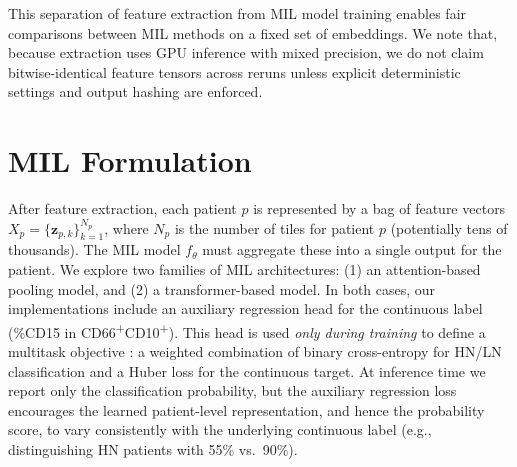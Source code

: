 This separation of feature extraction from MIL model training enables fair comparisons between MIL methods on a fixed set of embeddings. We note that, because extraction uses GPU inference with mixed precision, we do not claim bitwise-identical feature tensors across reruns unless explicit deterministic settings and output hashing are enforced.

\section{MIL Formulation}
\label{sec:mil-heads}
After feature extraction, each patient $p$ is represented by a bag of feature vectors $X_p = \{\mathbf{z}_{p,k}\}_{k=1}^{N_p}$, where $N_p$ is the number of tiles for patient $p$ (potentially tens of thousands). The MIL model $f_\theta$ must aggregate these into a single output for the patient. We explore two families of MIL architectures: (1) an attention-based pooling model, and (2) a transformer-based model. In both cases, our implementations include an auxiliary regression head for the continuous label (\%CD15 in CD66\textsuperscript{+}CD10\textsuperscript{+}). This head is used \emph{only during training} to define a multitask objective : a weighted combination of binary cross-entropy for HN/LN classification and a Huber loss for the continuous target. At inference time we report only the classification probability, but the auxiliary regression loss encourages the learned patient-level representation, and hence the probability score, to vary consistently with the underlying continuous label (e.g., distinguishing HN patients with 55\% vs.\ 90\%).

